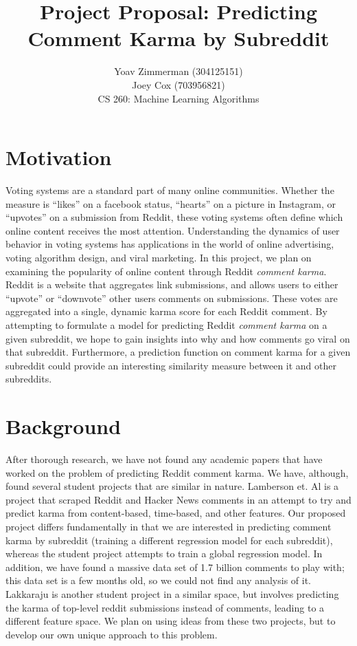 \documentclass[11pt, twocolumn]{article}
\begin{document}
\title{Project Proposal: Predicting Comment Karma by Subreddit}
\author{Yoav Zimmerman (304125151) \\
	    Joey Cox (703956821) \\
	    CS 260: Machine Learning Algorithms \\}
\maketitle

\section{Motivation}
Voting systems are a standard part of many online communities. Whether the measure is ``likes'' on a facebook status, “hearts” on a picture in Instagram, or “upvotes” on a submission from Reddit, these voting systems often define which online content receives the most attention. Understanding the dynamics of user behavior in voting systems has applications in the world of online advertising, voting algorithm design, and viral marketing. In this project, we plan on examining the popularity of online content through Reddit \textit{comment karma}. Reddit is a website that aggregates link submissions, and allows users to either “upvote” or “downvote” other users comments on submissions. These votes are aggregated into a single, dynamic karma score for each Reddit comment. By attempting to formulate a model for predicting Reddit \textit{comment karma} on a given subreddit, we hope to gain insights into why and how comments go viral on that subreddit. Furthermore, a prediction function on comment karma for a given subreddit could provide an interesting similarity measure between it and other subreddits.

\section{Background}
After thorough research, we have not found any academic papers that have worked on the problem of predicting Reddit comment karma. We have, although, found several student projects that are similar in nature. Lamberson et. Al \cite{lamberson} is a project that scraped Reddit and Hacker News comments in an attempt to try and predict karma from content-based, time-based, and other features. Our proposed project differs fundamentally in that we are interested in predicting comment karma by subreddit (training a different regression model for each subreddit), whereas the student project attempts to train a global regression model. In addition, we have found a massive data set of 1.7 billion comments to play with; this data set is a few months old, so we could not find any analysis of it. Lakkaraju \cite{lakkaraju} is another student project in a similar space, but involves predicting the karma of top-level reddit submissions instead of comments, leading to a different feature space. We plan on using ideas from these two projects, but to develop our own unique approach to this problem.
\end{document}
